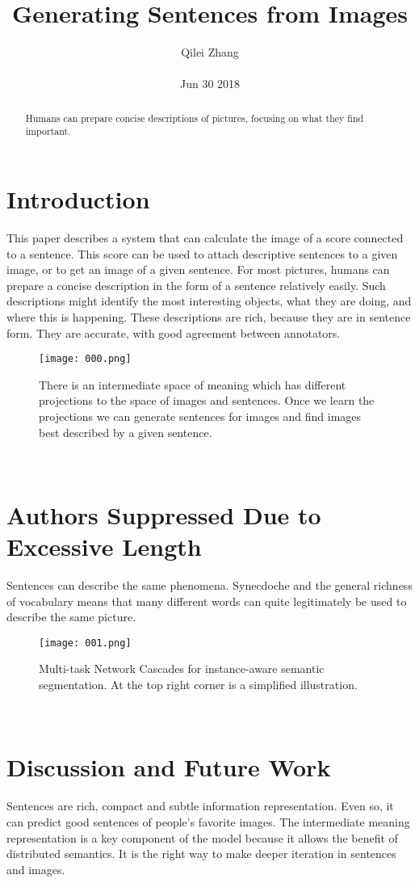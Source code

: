 \documentclass[30pt,twocolumn,letterpaper]{article}
\author{Qilei Zhang\\\\
Jun 30 2018}
\title{Generating Sentences from Images}
\begin{document}
\maketitle
\begin{abstract}
  Humans can prepare concise descriptions of pictures, focusing on what they find important.
\end{abstract}
\section{Introduction}
This paper describes a system that can calculate the image of a score connected to a sentence. This score can be used to attach descriptive sentences to a given image, or to get an image of a given sentence. For most pictures, humans can prepare a concise description in the form of a sentence relatively easily\cite{Agrawal2012Data}. Such descriptions might identify the most interesting objects, what they are doing, and where this is happening. These descriptions are rich, because they are in sentence form. They are accurate, with good agreement between annotators\cite{Javorszky2003Information}. \\
\begin{figure}[htbp]
\small
\centering
\texttt{[image: 000.png]}
\caption{There is an intermediate space of meaning which has different projections to
the space of images and sentences. Once we learn the projections we can generate
sentences for images and find images best described by a given sentence.}
\label{fig:lable}
\end{figure}\\
\section{Authors Suppressed Due to Excessive Length}
Sentences can describe the same phenomena. Synecdoche and the general richness of vocabulary means that many different words can quite legitimately be used to describe the same picture\cite{Kakumanu2006A}.\\
\begin{figure}[htbp]
\small
\centering
\texttt{[image: 001.png]}
\caption{Multi-task Network Cascades for instance-aware semantic segmentation. At the top right corner is a simplified illustration.}
\label{fig:lable}
\end{figure}\\
\section{Discussion and Future Work}
Sentences are rich, compact and subtle information representation. Even so, it can predict good sentences of people's favorite images. The intermediate meaning representation is a key component of the model because it allows the benefit of distributed semantics. It is the right way to make deeper iteration in sentences and images\cite{Zheng2011Algorithm}.
{\small


}
\end{document}
